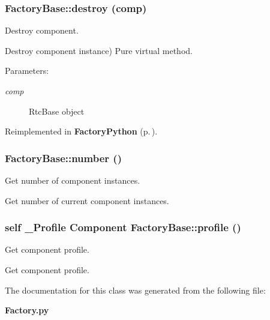 \subsubsection{\setlength{\rightskip}{0pt plus 5cm}Factory\-Base::destroy (comp)}\label{classFactoryBase_FactoryBasea3}


Destroy component. 

Destroy component instance) Pure virtual method. \begin{Desc}
\item[Parameters:]
\begin{description}
\item[{\em comp}]Rtc\-Base object\end{description}
\end{Desc}


Reimplemented in {\bf Factory\-Python} {\rm (p.\,\pageref{classFactoryPython_FactoryPythona2})}.
\subsubsection{\setlength{\rightskip}{0pt plus 5cm}Factory\-Base::number ()}\label{classFactoryBase_FactoryPythona6}


Get number of component instances. 

Get number of current component instances.
\subsubsection{\setlength{\rightskip}{0pt plus 5cm}self \_\-Profile Component Factory\-Base::profile ()}\label{classFactoryBase_FactoryPythona5}


Get component profile. 

Get component profile.

The documentation for this class was generated from the following file:\begin{CompactItemize}
\item 
{\bf Factory.py}\end{CompactItemize}
